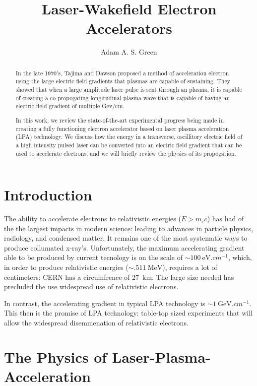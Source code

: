 \documentclass[12pt, titlepage]{article}
\title{Laser-Wakefield Electron Accelerators}
\author{Adam A. S. Green}
\begin{document}

\maketitle
\tableofcontents
\begin{abstract}
In the late 1970's, Tajima and Dawson proposed a method of acceleration electron
using the large electric field gradients that plasmas are capable of sustaining. They showed that when a large amplitude laser pulse is sent through an plasma, it is capable of creating a co-propogating longitudinal plasma wave that is capable of having an electric field gradient of multiple Gev/cm. 

In this work, we review the state-of-the-art experimental progress being made in creating a fully functioning electron accelerator based on laser plasma acceleration (LPA) technology. We discuss how the energy in a  transverse, oscillitory electric field of a high intensity pulsed laser can be converted into an electric field gradient that can be used to accelerate electrons, and we will briefly review the physics of its propogation. 
\end{abstract}
\section{Introduction}
\label{sec:intro}
The ability to accelerate electrons to relativistic energies ($ E > m_e c$) has had of the the largest impacts in modern science: leading to advances in particle physics, radiology, and condensed matter.
It remains one of the most systematic ways to produce collumated x-ray's.
Unfortunately, the maximum accelerating gradient able to be produced by current tecnology is on the scale of $\sim \SI{100}{\electronvolt.cm^{-1}}$, which, in order to produce relativistic
energies ($\sim \SI{.511}{\mega\electronvolt}$), requires a lot
of centimeters: CERN has a circumfrence of \SI{27}{km}. The large size needed has precluded the use widespread use of relativistic electrons.

In contrast, the accelerating gradient in typical LPA technology is $\sim \SI{1}{\giga\electronvolt.cm^{-1}}$. This then is the promise of LPA technology: table-top sized experiments that will allow the widespread disemmenation of relativistic electrons. 
\section{The Physics of Laser-Plasma-Acceleration}
\end{document}
